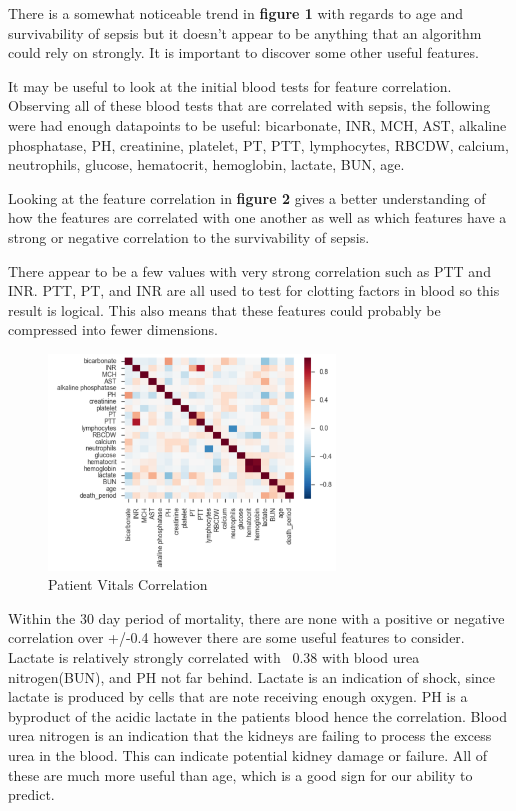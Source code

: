 \documentclass[11pt]{article}
\begin{document}
There is a somewhat noticeable trend in \textbf{figure 1} with regards to age and survivability of sepsis but it doesn't appear to be anything that an algorithm could rely on strongly. It is important to discover some other useful features.

It may be useful to look at the initial blood tests for feature correlation. Observing all of these blood tests that are correlated with sepsis, the following were had enough datapoints to be useful: bicarbonate, INR, MCH, AST, alkaline phosphatase, PH, creatinine, platelet, PT, PTT, lymphocytes, RBCDW, calcium, neutrophils, glucose, hematocrit, hemoglobin, lactate, BUN, age.

Looking at the feature correlation in \textbf{figure 2} gives a better understanding of how the features are correlated with one another as well as which features have a strong or negative correlation to the survivability of sepsis.




There appear to be a few values with very strong correlation such as PTT and INR. PTT, PT, and INR are all used to test for clotting factors in blood so this result is logical. This also means that these features could probably be compressed into fewer dimensions.

\begin{figure}
	\begin{center}
		\includegraphics[width=0.68\textwidth]{feature_correlation.png}
	\end{center}
	\caption{Patient Vitals Correlation}
\end{figure}

Within the 30 day period of mortality, there are none with a positive or negative correlation over +/-0.4 however there are some useful features to consider. Lactate is relatively strongly correlated with ~0.38 with blood urea nitrogen(BUN), and PH not far behind. Lactate is an indication of shock, since lactate is produced by cells that are note receiving enough oxygen. PH is a byproduct of the acidic lactate in the patients blood hence the correlation. Blood urea nitrogen is an indication that the kidneys are failing to process the excess urea in the blood. This can indicate potential kidney damage or failure. All of these are much more useful than age, which is a good sign for our ability to predict.
\end{document}
